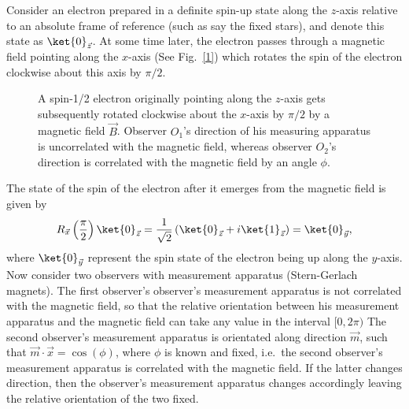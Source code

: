Consider an electron prepared in a definite spin-up state along the $z$-axis relative to an absolute frame of reference (such as say the fixed stars), and denote this state as $\ket{0}_{\vec{z}}$.  At some time later, the electron passes through a magnetic field pointing along the $x$-axis (See Fig.~\ref{1}) which rotates the spin of the electron  clockwise about this axis by $\pi/2$. 
\begin{figure}[htb]
\centering
{}
\qquad
{}
\caption{A spin-1/2 electron originally pointing along the $z$-axis gets subsequently rotated clockwise about the $x$-axis by $\pi/2$ by a magnetic field $\vec{B}$.  Observer $O_1$'s direction of his measuring apparatus is uncorrelated with the magnetic field, whereas observer $O_2$'s direction is correlated with the magnetic field by an angle $\phi$.}
\label{fig:1}
\end{figure}
The state of the spin of the electron after it emerges from the magnetic field is given by  
\begin{equation}
R_{\vec{x}}\left(\frac{\pi}{2}\right)\ket{0}_{\vec{z}}=\frac{1}{\sqrt{2}}\left(\ket{0}_{\vec{z}}+i\ket{1}_{\vec{z}}\right)=\ket{0}_{\vec{y}},
\label{1}
\end{equation}
where $\ket{0}_{\vec{y}}$ represent the spin state of the electron being up along the $y$-axis.  Now consider two observers with measurement apparatus (Stern-Gerlach magnets). The first observer's observer's measurement apparatus is not correlated with the magnetic field, so that the relative orientation between his measurement apparatus and the magnetic field can take any value in the interval $[0,2\pi)$ The second observer's measurement apparatus is orientated along direction $\vec{m}$, such that $\vec{m}\cdot\vec{x}=\cos(\phi)$, where $\phi$ is known and fixed, i.e.~the second observer's measurement apparatus is correlated with the magnetic field. If the latter changes direction, then the observer's measurement apparatus changes accordingly leaving the relative orientation of the two fixed.

